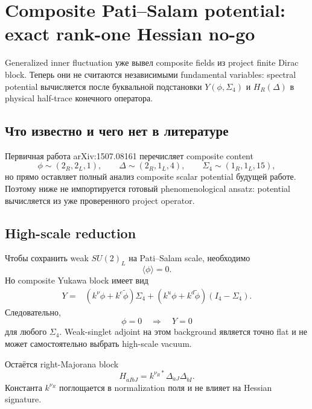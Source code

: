 \chapter{Composite Pati--Salam potential: exact rank-one Hessian no-go}

Generalized inner fluctuation уже вывел composite fields из project finite
Dirac block. Теперь они не считаются независимыми fundamental variables:
spectral potential вычисляется после буквальной подстановки
\(Y(\phi,\Sigma_4)\) и \(H_R(\Delta)\) в physical half-trace конечного
оператора.

\section{Что известно и чего нет в литературе}

Первичная работа arXiv:1507.08161 перечисляет composite content
\begin{equation}
 \phi\sim(2_R,2_L,1),\qquad
 \Delta\sim(2_R,1_L,4),\qquad
 \Sigma_4\sim(1_R,1_L,15),
\end{equation}
но прямо оставляет полный анализ composite scalar potential будущей работе.
Поэтому ниже не импортируется готовый phenomenological ansatz: potential
вычисляется из уже проверенного project operator.

\section{High-scale reduction}

Чтобы сохранить weak \(SU(2)_L\) на Pati--Salam scale, необходимо
\begin{equation}
 \langle\phi\rangle=0.
\end{equation}
Но composite Yukawa block имеет вид
\begin{align}
 Y={}&(k^\nu\phi+k^e\widetilde\phi)\Sigma_4
 +(k^u\phi+k^d\widetilde\phi)(I_4-\Sigma_4).
\end{align}
Следовательно,
\begin{equation}
 \boxed{\phi=0\quad\Longrightarrow\quad Y=0}
\end{equation}
для любого \(\Sigma_4\). Weak-singlet adjoint на этом background является
точно flat и не может самостоятельно выбрать high-scale vacuum.

Остаётся right-Majorana block
\begin{equation}
 H_{\dot aI\dot bJ}
 =k^{\nu_R*}\Delta_{\dot aJ}\Delta_{\dot bI}.
\end{equation}
Константа \(k^{\nu_R}\) поглощается в normalization поля и не влияет на
Hessian signature.


